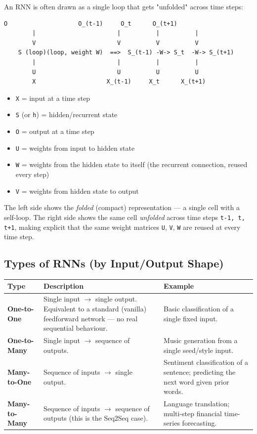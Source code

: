\documentclass[12pt,openany]{book}
\theoremstyle{definition}
\theoremstyle{remark}
\begin{document}
An RNN is often drawn as a single loop that gets "unfolded" across time steps:

\begin{lstlisting}[style=notesCode]
        O                    O_(t-1)     O_t      O_(t+1)
        |                       |          |          |
        V                       V          V          V
    S (loop)(loop, weight W)  ==>  S_(t-1) -W-> S_t  -W-> S_(t+1)
        |                       |          |          |
        U                       U          U          U
        X                    X_(t-1)     X_t      X_(t+1)
\end{lstlisting}

\begin{itemize}
\item \texttt{X} = input at a time step
\item \texttt{S} (or \texttt{h}) = hidden/recurrent state
\item \texttt{O} = output at a time step
\item \texttt{U} = weights from input to hidden state
\item \texttt{W} = weights from the hidden state to itself (the recurrent connection, reused every step)
\item \texttt{V} = weights from hidden state to output

\end{itemize}
The left side shows the \emph{folded} (compact) representation --- a single cell with a self-loop. The right side shows the same cell \emph{unfolded} across time steps \texttt{t-1, t, t+1}, making explicit that the same weight matrices \texttt{U}, \texttt{V}, \texttt{W} are reused at every time step.

\subsection{Types of RNNs (by Input/Output Shape)}

{\small
\begin{longtable}{@{}L{0.20\textwidth}L{0.34\textwidth}L{0.38\textwidth}@{}}
\toprule
Type & Description & Example \\
\midrule
\textbf{One-to-One} & Single input \ensuremath{\rightarrow} single output. Equivalent to a standard (vanilla) feedforward network --- no real sequential behaviour. & Basic classification of a single fixed input. \\
\textbf{One-to-Many} & Single input \ensuremath{\rightarrow} sequence of outputs. & Music generation from a single seed/style input. \\
\textbf{Many-to-One} & Sequence of inputs \ensuremath{\rightarrow} single output. & Sentiment classification of a sentence; predicting the next word given prior words. \\
\textbf{Many-to-Many} & Sequence of inputs \ensuremath{\rightarrow} sequence of outputs (this is the Seq2Seq case). & Language translation; multi-step financial time-series forecasting. \\
\bottomrule
\end{longtable}
}
\end{document}
